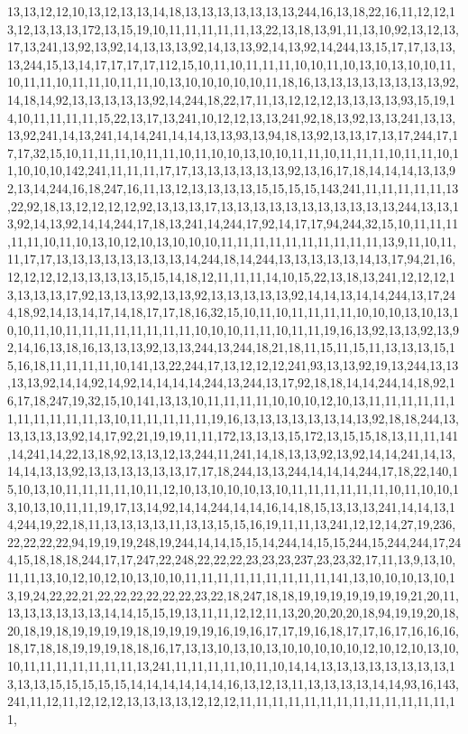 13,13,12,12,10,13,12,13,13,14,18,13,13,13,13,13,13,13,244,16,13,18,22,16,11,12,12,13,12,13,13,13,172,13,15,19,10,11,11,11,11,11,13,22,13,18,13,91,11,13,10,92,13,12,13,17,13,241,13,92,13,92,14,13,13,13,92,14,13,13,92,14,13,92,14,244,13,15,17,17,13,13,13,244,15,13,14,17,17,17,17,112,15,10,11,10,11,11,11,10,10,11,10,13,10,13,10,10,11,10,11,11,10,11,11,10,11,11,10,13,10,10,10,10,10,11,18,16,13,13,13,13,13,13,13,13,92,14,18,14,92,13,13,13,13,13,92,14,244,18,22,17,11,13,12,12,12,13,13,13,13,93,15,19,14,10,11,11,11,11,15,22,13,17,13,241,10,12,12,13,13,241,92,18,13,92,13,13,241,13,13,13,92,241,14,13,241,14,14,241,14,14,13,13,93,13,94,18,13,92,13,13,17,13,17,244,17,17,17,32,15,10,11,11,11,10,11,11,10,11,10,10,13,10,10,11,11,10,11,11,11,10,11,11,10,11,10,10,10,142,241,11,11,11,17,17,13,13,13,13,13,13,92,13,16,17,18,14,14,14,13,13,92,13,14,244,16,18,247,16,11,13,12,13,13,13,13,15,15,15,15,143,241,11,11,11,11,11,13,22,92,18,13,12,12,12,12,92,13,13,13,17,13,13,13,13,13,13,13,13,13,13,13,244,13,13,13,92,14,13,92,14,14,244,17,18,13,241,14,244,17,92,14,17,17,94,244,32,15,10,11,11,11,11,11,10,11,10,13,10,12,10,13,10,10,10,11,11,11,11,11,11,11,11,11,11,13,9,11,10,11,11,17,17,13,13,13,13,13,13,13,13,14,244,18,14,244,13,13,13,13,13,14,13,17,94,21,16,12,12,12,12,13,13,13,13,15,15,14,18,12,11,11,11,14,10,15,22,13,18,13,241,12,12,12,13,13,13,13,17,92,13,13,13,92,13,13,92,13,13,13,13,13,92,14,14,13,14,14,244,13,17,244,18,92,14,13,14,17,14,18,17,17,18,16,32,15,10,11,10,11,11,11,11,10,10,10,13,10,13,10,10,11,10,11,11,11,11,11,11,11,11,10,10,10,11,11,10,11,11,19,16,13,92,13,13,92,13,92,14,16,13,18,16,13,13,13,92,13,13,244,13,244,18,21,18,11,15,11,15,11,13,13,13,15,15,16,18,11,11,11,11,10,141,13,22,244,17,13,12,12,12,241,93,13,13,92,19,13,244,13,13,13,13,92,14,14,92,14,92,14,14,14,14,244,13,244,13,17,92,18,18,14,14,244,14,18,92,16,17,18,247,19,32,15,10,141,13,13,10,11,11,11,11,10,10,10,12,10,13,11,11,11,11,11,11,11,11,11,11,11,13,10,11,11,11,11,11,19,16,13,13,13,13,13,13,14,13,92,18,18,244,13,13,13,13,13,92,14,17,92,21,19,19,11,11,172,13,13,13,15,172,13,15,15,18,13,11,11,141,14,241,14,22,13,18,92,13,13,12,13,244,11,241,14,18,13,13,92,13,92,14,14,241,14,13,14,14,13,13,92,13,13,13,13,13,13,17,17,18,244,13,13,244,14,14,14,244,17,18,22,140,15,10,13,10,11,11,11,11,10,11,12,10,13,10,10,10,13,10,11,11,11,11,11,11,10,11,10,10,13,10,13,10,11,11,19,17,13,14,92,14,14,244,14,14,16,14,18,15,13,13,13,241,14,14,13,14,244,19,22,18,11,13,13,13,13,11,13,13,15,15,16,19,11,11,13,241,12,12,14,27,19,236,22,22,22,22,94,19,19,19,248,19,244,14,14,15,15,14,244,14,15,15,244,15,244,244,17,244,15,18,18,18,244,17,17,247,22,248,22,22,22,23,23,23,237,23,23,32,17,11,13,9,13,10,11,11,13,10,12,10,12,10,13,10,10,11,11,11,11,11,11,11,11,11,141,13,10,10,10,13,10,13,19,24,22,22,21,22,22,22,22,22,22,23,22,18,247,18,18,19,19,19,19,19,19,19,21,20,11,13,13,13,13,13,13,14,14,15,15,19,13,11,11,12,12,11,13,20,20,20,20,18,94,19,19,20,18,20,18,19,18,19,19,19,19,18,19,19,19,19,16,19,16,17,17,19,16,18,17,17,16,17,16,16,16,18,17,18,18,19,19,19,18,18,16,17,13,13,10,13,10,13,10,10,10,10,10,12,10,12,10,13,10,10,11,11,11,11,11,11,11,13,241,11,11,11,11,10,11,10,14,14,13,13,13,13,13,13,13,13,13,13,13,15,15,15,15,15,14,14,14,14,14,14,16,13,12,13,11,13,13,13,13,14,14,93,16,143,241,11,12,11,12,12,12,13,13,13,13,12,12,12,11,11,11,11,11,11,11,11,11,11,11,11,11,11,